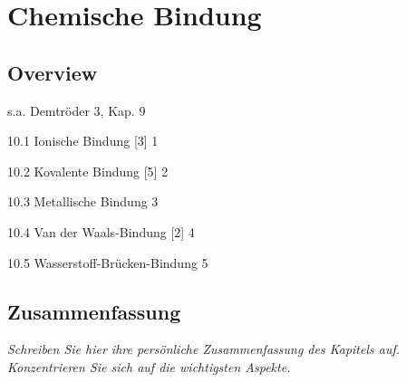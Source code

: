 \renewcommand{\lastmod}{10. September 2024}
\renewcommand{\chapterauthors}{Markus Lippitz}

\chapter{Chemische Bindung}






\section{Overview}

s.a. Demtröder 3, Kap. 9



10.1 Ionische Bindung [3] 1	

10.2 Kovalente Bindung [5] 2	

10.3 Metallische Bindung 3	

10.4 Van der Waals-Bindung [2] 4	

10.5 Wasserstoff-Brücken-Bindung 5	



\section{Zusammenfassung}

\textit{Schreiben Sie hier ihre persönliche Zusammenfassung des Kapitels auf. Konzentrieren Sie sich auf die wichtigsten Aspekte.}

\vspace*{10cm}


\printbibliography[segment=\therefsegment,heading=subbibliography]
